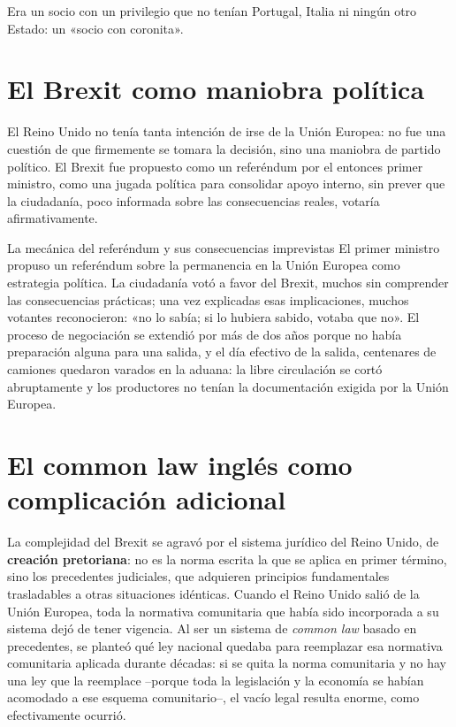 \documentclass[12pt,oneside]{book}
\begin{document}
Era un socio con un privilegio que no tenían Portugal, Italia ni ningún otro Estado: un «socio con coronita».

\section{El Brexit como maniobra política}

El Reino Unido no tenía tanta intención de irse de la Unión Europea: no fue una cuestión de que firmemente se tomara la decisión, sino una maniobra de partido político. El Brexit fue propuesto como un referéndum por el entonces primer ministro, como una jugada política para consolidar apoyo interno, sin prever que la ciudadanía, poco informada sobre las consecuencias reales, votaría afirmativamente.

\begin{ejemplo}{La mecánica del referéndum y sus consecuencias imprevistas}
El primer ministro propuso un referéndum sobre la permanencia en la Unión Europea como estrategia política. La ciudadanía votó a favor del Brexit, muchos sin comprender las consecuencias prácticas; una vez explicadas esas implicaciones, muchos votantes reconocieron: «no lo sabía; si lo hubiera sabido, votaba que no». El proceso de negociación se extendió por más de dos años porque no había preparación alguna para una salida, y el día efectivo de la salida, centenares de camiones quedaron varados en la aduana: la libre circulación se cortó abruptamente y los productores no tenían la documentación exigida por la Unión Europea.
\end{ejemplo}

\section{El common law inglés como complicación adicional}

La complejidad del Brexit se agravó por el sistema jurídico del Reino Unido, de \textbf{creación pretoriana}: no es la norma escrita la que se aplica en primer término, sino los precedentes judiciales, que adquieren principios fundamentales trasladables a otras situaciones idénticas. Cuando el Reino Unido salió de la Unión Europea, toda la normativa comunitaria que había sido incorporada a su sistema dejó de tener vigencia. Al ser un sistema de \emph{common law} basado en precedentes, se planteó qué ley nacional quedaba para reemplazar esa normativa comunitaria aplicada durante décadas: si se quita la norma comunitaria y no hay una ley que la reemplace --porque toda la legislación y la economía se habían acomodado a ese esquema comunitario--, el vacío legal resulta enorme, como efectivamente ocurrió.
\end{document}
